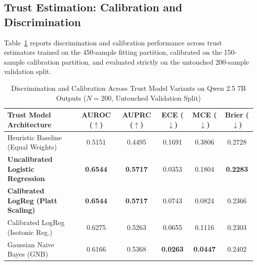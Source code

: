 \documentclass[journal,10pt]{IEEEtran}
\begin{document}
\subsection{Trust Estimation: Calibration and Discrimination}
Table~\ref{tab:trust} reports discrimination and calibration performance across trust estimators trained on the 450-sample fitting partition, calibrated on the 150-sample calibration partition, and evaluated strictly on the untouched 200-sample validation split.

\begin{table}[htbp]
\caption{Discrimination and Calibration Across Trust Model Variants on Qwen 2.5 7B Outputs ($N=200$, Untouched Validation Split)}
\label{tab:trust}
\centering
\begin{tabular}{lccccc}
\toprule
\textbf{Trust Model Architecture} & \textbf{AUROC ($\uparrow$)} & \textbf{AUPRC ($\uparrow$)} & \textbf{ECE ($\downarrow$)} & \textbf{MCE ($\downarrow$)} & \textbf{Brier ($\downarrow$)} \\
\midrule
Heuristic Baseline (Equal Weights) & 0.5151 & 0.4495 & 0.1691 & 0.3806 & 0.2728 \\
\textbf{Uncalibrated Logistic Regression} & \textbf{0.6544} & \textbf{0.5717} & 0.0353 & 0.1804 & \textbf{0.2283} \\
\textbf{Calibrated LogReg (Platt Scaling)} & \textbf{0.6544} & \textbf{0.5717} & 0.0743 & 0.0824 & 0.2366 \\
Calibrated LogReg (Isotonic Reg.) & 0.6275 & 0.5263 & 0.0655 & 0.1116 & 0.2303 \\
Gaussian Naive Bayes (GNB) & 0.6166 & 0.5368 & \textbf{0.0263} & \textbf{0.0447} & 0.2402 \\
\bottomrule
\end{tabular}
\end{table}
\end{document}
